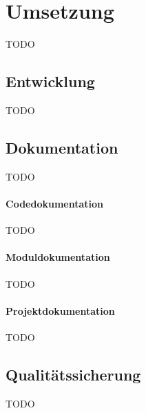 \section{Umsetzung}
TODO
\subsection{Entwicklung}
TODO
\subsection{Dokumentation}
TODO
\paragraph{Codedokumentation}
TODO
\paragraph{Moduldokumentation}
TODO
\paragraph{Projektdokumentation}
TODO
\subsection{Qualitätssicherung}
TODO